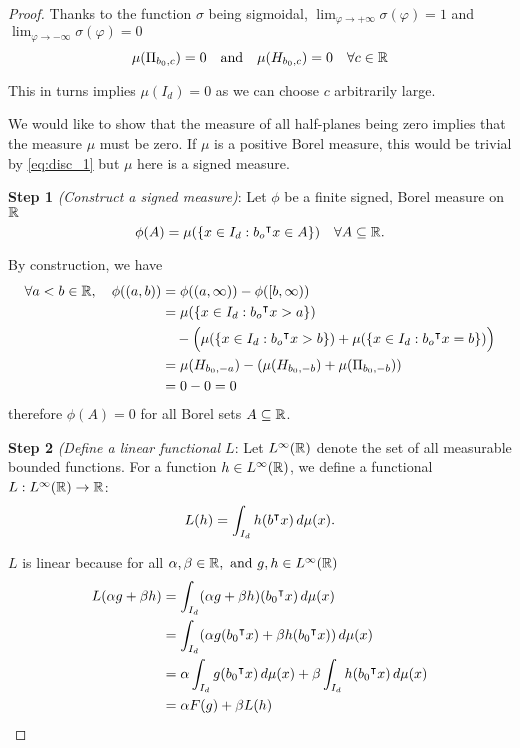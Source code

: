 \begin{proof}
    Thanks to the function $\sigma$ being sigmoidal, $\lim_{\varphi\to +\infty}
    \sigma(\varphi)= 1$ and $\lim_{\varphi\to -\infty} \sigma(\varphi)=0$
    \begin{equation}
        \label{eq:disc_1}
        \mu(\Pi_{b_0, c}) = 0 \quad \text{and} \quad \mu (H_{b_0, c}) = 0 
        \quad \forall c\in\mathbb{R}
    \end{equation}

    This in turns implies $\mu(I_d) = 0$ as we can choose $c$ arbitrarily large.
    
    We would like to show that the measure of all half-planes being zero implies
    that the measure $\mu$ must be zero. If $\mu$ is a positive Borel measure,
    this would be trivial by \eqref{eq:disc_1} but $\mu$ here is a signed
    measure.
    
    \textbf{Step 1} \textit{(Construct a signed measure)}: Let $\phi$ be a
    finite signed, Borel measure on $\mathbb{R}$
    \begin{equation}
        \label{eq:disc_2}
        \phi(A) = \mu(\{x \in I_d: b_o{}^{\intercal} x \in A\}) \quad \forall A \subseteq \mathbb{R}.
    \end{equation}

    By construction, we have
    \begin{align}
        \forall a < b \in \mathbb{R}, \quad \phi((a,b)) 
        &= \phi((a,\infty)) - \phi([b, \infty)) \\
        &= \mu(\{x \in I_d: b_o{}^{\intercal} x > a\}) \\
        &\quad- \Big(
                \mu(\{x \in I_d: b_o{}^{\intercal} x > b\})
                + \mu(\{x \in I_d: b_o{}^{\intercal} x = b\})
                \Big) \\
        &= \mu(H_{b_0, -a}) - (\mu(H_{b_0, -b}) + \mu(\Pi_{b_0, -b})) \\
        &= 0 - 0 = 0
    \end{align}
    therefore $\phi(A) = 0$ for all Borel sets $A \subseteq \mathbb{R}$.

    \textbf{Step 2} \textit{(Define a linear functional $L$}: Let
    $L^{\infty}(\mathbb{R})$ denote the set of all measurable bounded functions. For a
    function $h \in L^{\infty}(\mathbb{R})$, we define a functional $L: L^{\infty}(\mathbb{R})
    \to \mathbb{R}$:
    \begin{equation}
        L(h) = \int_{I_d} h(b{}^{\intercal} x)\,d\mu(x).
    \end{equation}

    $L$ is linear because for all $\alpha, \beta \in \mathbb{R}, \text{ and } g, h \in
    L^{\infty}(\mathbb{R})$
    \begin{align*}
        L(\alpha g + \beta h)
        &= \int_{I_d} (\alpha g + \beta h) (b_0{}^{\intercal} x) \,d\mu(x) \\
        &= \int_{I_d} (\alpha g(b_0{}^{\intercal} x) + \beta h (b_0{}^{\intercal} x)) \, d\mu(x) \\
        &= \alpha \int_{I_d} g(b_0{}^{\intercal} x) \,d\mu(x) + \beta \int_{I_d} h(b_0{}^{\intercal} x) \,d\mu(x) \\
        &= \alpha F(g) + \beta L(h)
    \end{align*}


\end{proof}
